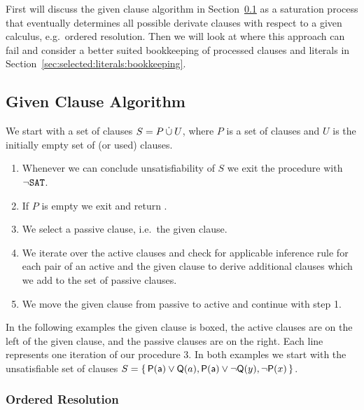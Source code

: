 First will discuss the given clause algorithm in Section~\ref{sec:given:clause:algorithm}
as a saturation process that eventually determines all possible derivate clauses
with respect to a given calculus, e.g.~ordered resolution.
Then we will look at \InstGen{} where this approach can fail
and consider a better suited bookkeeping of processed clauses and literals
in Section~\ref{sec:selected:literals:bookkeeping}.


\subsection{Given Clause Algorithm}\label{sec:given:clause:algorithm}

\begin{procedure}
	We start with a set of clauses \( S = P \mathbin{\dot\cup} U \),
	where \( P \) is a set of  clauses
	and \( U \) is the initially empty set of  (or used) clauses.
	\begin{enumerate}
		\item[\jek] Whenever we can conclude unsatisfiability of \( S \)
		we exit the procedure with \( \lnot\texttt{SAT} \).
		\setcounter{enumi}{0}
		\item If \( P \) is empty we exit and return \SAT{}.
		\item We select a passive clause, i.e.~the given clause. \hfill\jek{}
		\item We iterate over the active clauses and check for applicable inference rule
		for each pair of an active and the given clause
		to derive additional clauses which we add to the set of passive clauses. \hfill\jek{}
		\item We move the given clause from passive to active and continue with step 1.
	\end{enumerate}
\end{procedure}


In the following examples the given clause is boxed,
the active clauses are on the left of the given clause,
and the passive clauses are on the right.
Each line represents one iteration of our procedure 3.
%
In both examples we start with the unsatisfiable set of clauses
\( S=\{ \, \mathsf{P}(\mathsf{a})\lor\mathsf{Q}(a), \mathsf{P}(\mathsf{a})\lor\lnot\mathsf{Q}(y), \lnot\mathsf{P}(x) \, \} \).

\subsubsection{Ordered Resolution}

